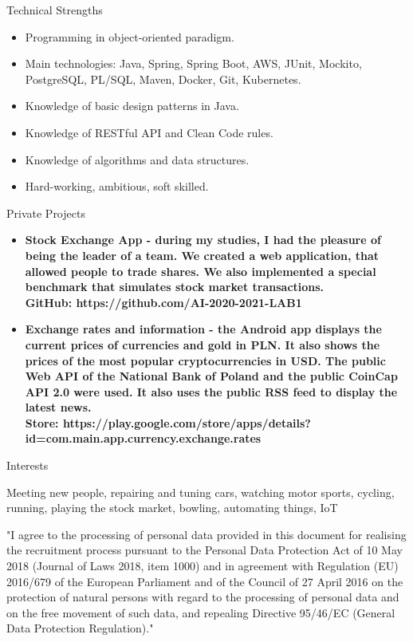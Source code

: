 \documentclass{resume}
\begin{document}
\begin{rSection}{Technical Strengths}

    \begin{itemize}
        \item Programming in object-oriented paradigm.
        \item Main technologies: Java, Spring, Spring Boot, AWS, JUnit, Mockito, PostgreSQL, PL/SQL, Maven, Docker, Git, Kubernetes.
        \item Knowledge of basic design patterns in Java.
        \item Knowledge of RESTful API and Clean Code rules.
        \item Knowledge of algorithms and data structures.
        \item Hard-working, ambitious, soft skilled.
    \end{itemize}

\end{rSection}

\begin{rSection}{Private Projects}

    \begin{itemize}
        \item \bf Stock Exchange App \normalfont - during my studies, I had the pleasure of being the leader of a team.
              We created a web application, that allowed people to trade shares. We also implemented a special benchmark that simulates stock market transactions.\\
              GitHub: https://github.com/AI-2020-2021-LAB1
        \item \bf Exchange rates and information \normalfont - the Android app displays the current prices of currencies and gold in PLN.
              It also shows the prices of the most popular cryptocurrencies in USD.
              The public Web API of the National Bank of Poland and the public CoinCap API 2.0 were used.
              It also uses the public RSS feed to display the latest news.\\
              Store: https://play.google.com/store/apps/details?id=com.main.app.currency.exchange.rates
    \end{itemize}

\end{rSection}

\begin{rSection}{Interests}

    {Meeting new people, repairing and tuning cars, watching motor sports, cycling, running, playing the stock market, bowling, automating things, IoT}

\end{rSection}

{\footnotesize "I agree to the processing of personal data provided in this document for realising the recruitment process pursuant to the Personal Data
Protection Act of 10 May 2018 (Journal of Laws 2018, item 1000) and in agreement with Regulation (EU) 2016/679 of the European Parliament and of
the Council of 27 April 2016 on the protection of natural persons with regard to the processing of personal data and on the free movement of such
data, and repealing Directive 95/46/EC (General Data Protection Regulation)."}
\end{document}
